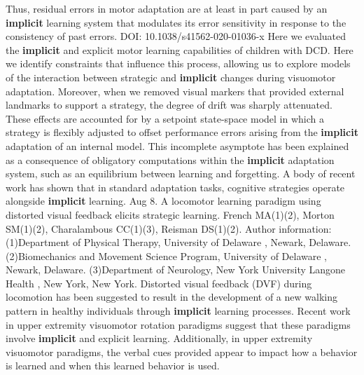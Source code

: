 \documentclass[11pt]{article}
\begin{document}
\newline  [  83  ]   Thus, residual errors in motor adaptation are at least in part caused  by an   \textbf {  implicit  }   learning system that modulates its error sensitivity in response  to the consistency of past errors.  DOI: 10.1038/s41562-020-01036-x
\newline  [  84  ]   Here we evaluated the    \textbf {  implicit  }   and explicit motor learning capabilities of children with DCD.
\newline  [  85  ]   Here we identify constraints that influence this process,  allowing us to explore models of the interaction between strategic and   \textbf {  implicit  }    changes during visuomotor adaptation.
\newline  [  86  ]   Moreover, when we removed visual markers that provided external  landmarks to support a strategy, the degree of drift was sharply attenuated.  These effects are accounted for by a setpoint state-space model in which a  strategy is flexibly adjusted to offset performance errors arising from the    \textbf {  implicit  }   adaptation of an internal model.
\newline  [  87  ]   This incomplete asymptote has been  explained as a consequence of obligatory computations within the   \textbf {  implicit  }    adaptation system, such as an equilibrium between learning and forgetting.
\newline  [  88  ]   A  body of recent work has shown that in standard adaptation tasks, cognitive  strategies operate alongside   \textbf {  implicit  }   learning.
 Aug 8.  A locomotor learning paradigm using distorted visual feedback elicits strategic  learning.  French MA(1)(2), Morton SM(1)(2), Charalambous CC(1)(3), Reisman DS(1)(2).  Author information: (1)Department of Physical Therapy, University of Delaware , Newark, Delaware. (2)Biomechanics and Movement Science Program, University of Delaware , Newark,  Delaware. (3)Department of Neurology, New York University Langone Health , New York, New  York.  Distorted visual feedback (DVF) during locomotion has been suggested to result  in the development of a new walking pattern in healthy individuals through    \textbf {  implicit  }   learning processes.
\newline  [  90  ]   Recent work in upper extremity visuomotor rotation  paradigms suggest that these paradigms involve   \textbf {  implicit  }   and explicit learning.  Additionally, in upper extremity visuomotor paradigms, the verbal cues provided  appear to impact how a behavior is learned and when this learned behavior is  used.
\end{document}
